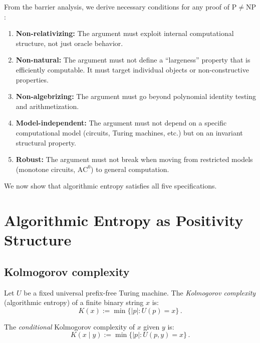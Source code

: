 \documentclass[aps,prd,twocolumn,superscriptaddress,nofootinbib]{revtex4-2}
\theoremstyle{definition}
\theoremstyle{remark}
\newcommand{\NP}{\mathrm{NP}}
\newcommand{\PP}{\mathrm{P}}
\begin{document}
From the barrier analysis, we derive necessary conditions for any proof of $\PP \neq \NP$:

\begin{enumerate}
\item[\textbf{(S1)}] \textbf{Non-relativizing:} The argument must exploit internal computational structure, not just oracle behavior.
\item[\textbf{(S2)}] \textbf{Non-natural:} The argument must not define a ``largeness'' property that is efficiently computable. It must target individual objects or non-constructive properties.
\item[\textbf{(S3)}] \textbf{Non-algebrizing:} The argument must go beyond polynomial identity testing and arithmetization.
\item[\textbf{(S4)}] \textbf{Model-independent:} The argument must not depend on a specific computational model (circuits, Turing machines, etc.) but on an invariant structural property.
\item[\textbf{(S5)}] \textbf{Robust:} The argument must not break when moving from restricted models (monotone circuits, $\mathrm{AC}^0$) to general computation.
\end{enumerate}

We now show that algorithmic entropy satisfies all five specifications.


\section{Algorithmic Entropy as Positivity Structure}
\label{sec:entropy}

\subsection{Kolmogorov complexity}

Let $U$ be a fixed universal prefix-free Turing machine. The \textit{Kolmogorov complexity} (algorithmic entropy) of a finite binary string $x$ is:
\begin{equation}
K(x) := \min\{|p| : U(p) = x\}\,.
\label{eq:kolmogorov}
\end{equation}

The \textit{conditional} Kolmogorov complexity of $x$ given $y$ is:
\begin{equation}
K(x \mid y) := \min\{|p| : U(p, y) = x\}\,.
\label{eq:conditional_K}
\end{equation}
\end{document}

